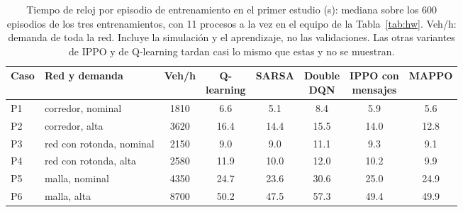 \begin{table}[H]
\centering
\footnotesize
\setlength{\tabcolsep}{4pt}
\begin{tabular}{llcccccc}
\toprule
Caso & Red y demanda & Veh/h & \makecell{Q-\\learning} & SARSA & \makecell{Double\\DQN} & \makecell{IPPO con\\mensajes} & MAPPO \\
\midrule
P1 & corredor, nominal        & 1810 & 6.6  & 5.1  & 8.4  & 5.9  & 5.6  \\
P2 & corredor, alta           & 3620 & 16.4 & 14.4 & 15.5 & 14.0 & 12.8 \\
P3 & red con rotonda, nominal & 2150 & 9.0  & 9.0  & 11.1 & 9.3  & 9.1  \\
P4 & red con rotonda, alta    & 2580 & 11.9 & 10.0 & 12.0 & 10.2 & 9.9  \\
P5 & malla, nominal           & 4350 & 24.7 & 23.6 & 30.6 & 25.0 & 24.9 \\
P6 & malla, alta              & 8700 & 50.2 & 47.5 & 57.3 & 49.4 & 49.9 \\
\bottomrule
\end{tabular}
\caption[Tiempo por episodio de entrenamiento]{Tiempo de reloj por episodio de entrenamiento en el
primer estudio (s): mediana sobre los 600 episodios de los tres entrenamientos, con 11 procesos a
la vez en el equipo de la Tabla~\ref{tab:hw}. Veh/h: demanda de toda la red. Incluye la simulación
y el aprendizaje, no las validaciones. Las otras variantes de IPPO y de Q-learning tardan casi lo
mismo que estas y no se muestran.}
\label{tab:plan2-costo}
\end{table}
